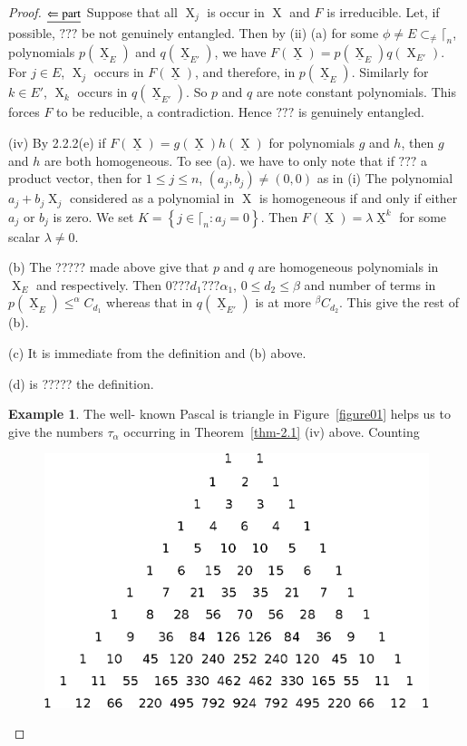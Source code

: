 \documentclass[a4paper,12pt]{article}
\DeclareMathOperator{\x}{\mathrm{X}}
\theoremstyle{definition}
\theoremstyle{underlinethm}
\newtheorem{example}{Example}[section]
\theoremstyle{underline}
\begin{document}
\begin{proof}
  $\underline{\Leftarrow {\rm part}}$ Suppose that all $\x_{j}$ is occur in $\x$ and $F$ is irreducible. Let, if possible, $???$ be not genuinely entangled. Then by (ii) (a) for some $\phi \neq E \subset_{\neq} \lceil_{n}$, polynomials $p(\underline{\x}_{E})$ and $q(\underline{\x}_{E'})$, we have $F(\underline{\x}) = p(\underline{\x}_{E}) q (\x_{E'})$. For $j \in E$, $\x_{j}$ occurs in $F(\underline{\x})$, and therefore, in $p(\underline{\x}_{E})$. Similarly for $k \in E'$, $\x_{k}$ occurs in $q(\underline{\x}_{E'})$. So $p$ and $q$ are note constant polynomials. This forces $F$ to be reducible, a contradiction. Hence $???$ is genuinely entangled.
  
  (iv) By 2.2.2(e) if $F(\underline{\x})= g(\underline{\x}) h(\underline{\x})$ for polynomials $g$ and $h$, then $g$ and $h$ are both homogeneous. To see (a). we have to only note that if $???$ a product vector, then for $1 \leq j \leq n$, $(a_{j}, b_{j}) \neq (0,0)$ as in (i) The polynomial $a_{j} + b_{j} \x_{j}$ considered as a polynomial in $\x$ is homogeneous if and only if either $a_{j}$ or $b_{j}$ is zero. We set $K = \left\{ j \in \lceil_{n} : a_{j} = 0\right\}$. Then $F(\underline{\x}) = \lambda\underline{\x}^{k}$ for some scalar $\lambda \neq 0$.
  
  (b) The ????? made above give that $p$ and $q$ are homogeneous polynomials in $\x_{E}$ and respectively. Then  $0 ??? d_{1} ??? \alpha_{1}$, $0 \leq d_{2} \leq \beta $ and number of terms in $p(\underline{\x}_{E}) \leq ^{\alpha}C_{d_{1}}$  whereas that in $q(\underline{\x}_{E'})$ is at more $^{\beta}C_{d_{2}}$. This give the rest of (b).
  
  (c) It is immediate from the definition and (b) above.
  
  (d) is ????? the definition.
 
 \begin{example}\label{example-2.1}
The well- known Pascal is triangle in Figure~\ref{figure01} helps us to give the numbers $\tau_{\alpha}$ occurring in Theorem~\ref{thm-2.1} (iv) above. Counting 

\begin{figure}[h]
\centering
\includegraphics[scale=.8]{figure/fig1.eps}
\caption{}\label{fig01}
\end{figure}


\end{example}
\end{proof}
\end{document}
